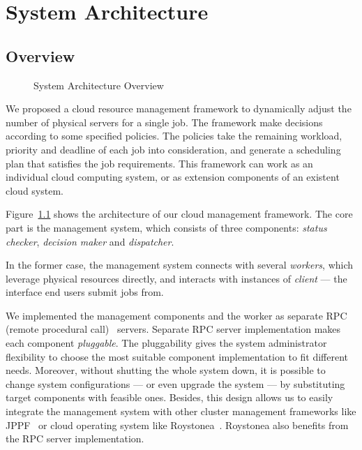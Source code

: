 \chapter{System Architecture}

\section{Overview}

\begin{figure}[h]
  \centering
  
  \caption{System Architecture Overview}
  \label{fig:archi-overview}
\end{figure}

We proposed a cloud resource management framework to dynamically adjust
the number of physical servers for a single job.
The framework make decisions according to some specified policies.
The policies take the remaining workload, priority and deadline of each
job into consideration, and generate a scheduling plan that satisfies
the job requirements.
This framework can work as an individual cloud computing system, or as
extension components of an existent cloud system.

Figure~\ref{fig:archi-overview} shows the architecture of our cloud
management framework.
The core part is the management system, which consists of three
components: \emph{status checker}, \emph{decision maker} and
\emph{dispatcher}.

In the former case, the management system connects with several
\emph{workers}, which leverage physical resources directly, and
interacts with instances of \emph{client} --- the interface end users
submit jobs from.

We implemented the management components and the worker as separate RPC
(remote procedural call)~\cite{cite:RPC} servers.
Separate RPC server implementation makes each component
\emph{pluggable}.
The pluggability gives the system administrator flexibility to choose
the most suitable component implementation to fit different needs.
Moreover, without shutting the whole system down, it is possible to
change system configurations --- or even upgrade the system --- by
substituting target components with feasible ones.
Besides, this design allows us to easily integrate the management system
with other cluster management frameworks like JPPF~\cite{cite:JPPF} or
cloud operating system like Roystonea~\cite{cite:roystonea}.
Roystonea also benefits from the RPC server implementation.

